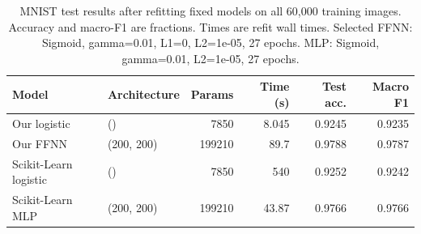 \begin{table}[t]
    \centering
    \caption{MNIST test results after refitting fixed models on all 60,000 training images. Accuracy and macro-F1 are fractions. Times are refit wall times. Selected FFNN: Sigmoid, gamma=0.01, L1=0, L2=1e-05, 27 epochs. MLP: Sigmoid, gamma=0.01, L2=1e-05, 27 epochs.}
    \label{tab:part_e_final_comparison}
\begin{tabular}{llrrrr}
\hline\hline
Model & Architecture & Params & Time (s) & Test acc. & Macro F1 \\
\hline
Our logistic & () & 7850 & 8.045 & 0.9245 & 0.9235 \\
Our FFNN & (200, 200) & 199210 & 89.7 & 0.9788 & 0.9787 \\
Scikit-Learn logistic & () & 7850 & 540 & 0.9252 & 0.9242 \\
Scikit-Learn MLP & (200, 200) & 199210 & 43.87 & 0.9766 & 0.9766 \\
\hline\hline
\end{tabular}
\end{table}
